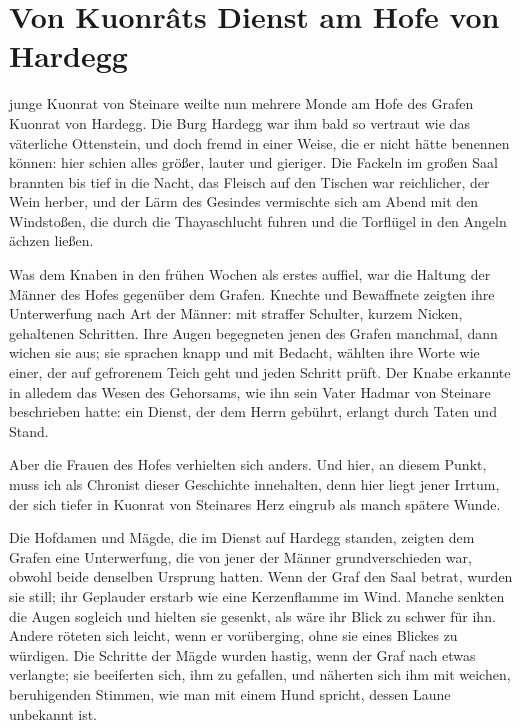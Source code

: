 
\section{Von Kuonr\^{a}ts Dienst am Hofe von Hardegg}

 junge \gls{Kuonrat von Steinare} weilte nun mehrere Monde am Hofe des Grafen \gls{Kuonrat von Hardegg}. Die Burg \gls{Hardegg} war ihm bald so vertraut wie das väterliche Ottenstein, und doch fremd in einer Weise, die er nicht hätte benennen können: hier schien alles größer, lauter und gieriger. Die Fackeln im großen Saal brannten bis tief in die Nacht, das Fleisch auf den Tischen war reichlicher, der Wein herber, und der Lärm des Gesindes vermischte sich am Abend mit den Windstoßen, die durch die Thayaschlucht fuhren und die Torflügel in den Angeln ächzen ließen.

Was dem Knaben in den frühen Wochen als erstes auffiel, war die Haltung der Männer des Hofes gegenüber dem Grafen. Knechte und Bewaffnete zeigten ihre Unterwerfung nach Art der Männer: mit straffer Schulter, kurzem Nicken, gehaltenen Schritten. Ihre Augen begegneten jenen des Grafen manchmal, dann wichen sie aus; sie sprachen knapp und mit Bedacht, wählten ihre Worte wie einer, der auf gefrorenem Teich geht und jeden Schritt prüft. Der Knabe erkannte in alledem das Wesen des Gehorsams, wie ihn sein Vater \gls{Hadmar von Steinare} beschrieben hatte: ein Dienst, der dem Herrn gebührt, erlangt durch Taten und Stand.

Aber die Frauen des Hofes verhielten sich anders. Und hier, an diesem Punkt, muss ich als Chronist dieser Geschichte innehalten, denn hier liegt jener Irrtum, der sich tiefer in \gls{Kuonrat von Steinare}s Herz eingrub als manch spätere Wunde.

Die Hofdamen und Mägde, die im Dienst auf \gls{Hardegg} standen, zeigten dem Grafen eine Unterwerfung, die von jener der Männer grundverschieden war, obwohl beide denselben Ursprung hatten. Wenn der Graf den Saal betrat, wurden sie still; ihr Geplauder erstarb wie eine Kerzenflamme im Wind. Manche senkten die Augen sogleich und hielten sie gesenkt, als wäre ihr Blick zu schwer für ihn. Andere röteten sich leicht, wenn er vorüberging, ohne sie eines Blickes zu würdigen. Die Schritte der Mägde wurden hastig, wenn der Graf nach etwas verlangte; sie beeiferten sich, ihm zu gefallen, und näherten sich ihm mit weichen, beruhigenden Stimmen, wie man mit einem Hund spricht, dessen Laune unbekannt ist.

